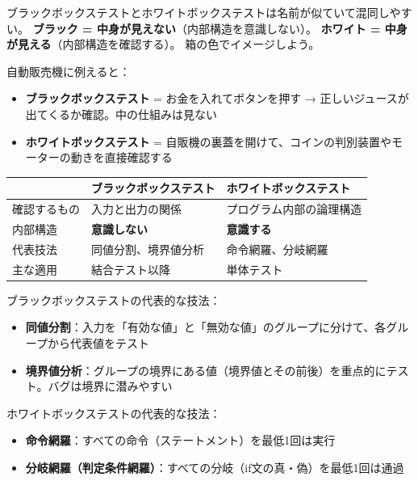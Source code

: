 \begin{stumble}
ブラックボックステストとホワイトボックステストは名前が似ていて混同しやすい。
\textbf{ブラック = 中身が見えない}（内部構造を意識しない）。
\textbf{ホワイト = 中身が見える}（内部構造を確認する）。
箱の色でイメージしよう。
\end{stumble}

\begin{analogy}
自動販売機に例えると：
\begin{itemize}
  \item \textbf{ブラックボックステスト} = お金を入れてボタンを押す → 正しいジュースが出てくるか確認。中の仕組みは見ない
  \item \textbf{ホワイトボックステスト} = 自販機の裏蓋を開けて、コインの判別装置やモーターの動きを直接確認する
\end{itemize}
\end{analogy}

\begin{comparison}
\begin{tabularx}{\textwidth}{lXX}
  \toprule
  & \textbf{ブラックボックステスト} & \textbf{ホワイトボックステスト} \\
  \midrule
  確認するもの & 入力と出力の関係 & プログラム内部の論理構造 \\
  内部構造 & \textbf{意識しない} & \textbf{意識する} \\
  代表技法 & 同値分割、境界値分析 & 命令網羅、分岐網羅 \\
  主な適用 & 結合テスト以降 & 単体テスト \\
  \bottomrule
\end{tabularx}
\end{comparison}

\begin{keypoint}
ブラックボックステストの代表的な技法：
\begin{itemize}
  \item \textbf{同値分割}：入力を「有効な値」と「無効な値」のグループに分けて、各グループから代表値をテスト
  \item \textbf{境界値分析}：グループの境界にある値（境界値とその前後）を重点的にテスト。バグは境界に潜みやすい
\end{itemize}
ホワイトボックステストの代表的な技法：
\begin{itemize}
  \item \textbf{命令網羅}：すべての命令（ステートメント）を最低1回は実行
  \item \textbf{分岐網羅（判定条件網羅）}：すべての分岐（if文の真・偽）を最低1回は通過
\end{itemize}
\end{keypoint}

